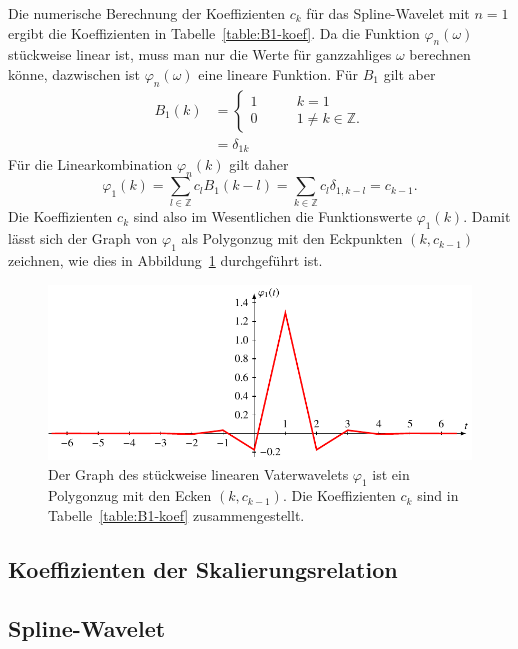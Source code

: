 \begin{beispiel}
Die numerische Berechnung der Koeffizienten $c_k$ für das Spline-Wavelet 
mit $n=1$ ergibt die Koeffizienten in Tabelle~\ref{table:B1-koef}.
Da die Funktion $\varphi_n(\omega)$ stückweise linear ist, muss man nur die
Werte für ganzzahliges $\omega$ berechnen könne, dazwischen ist
$\varphi_n(\omega)$ eine lineare Funktion.
Für $B_1$ gilt aber
\begin{align*}
B_1(k)
&=
\begin{cases}
1&\qquad k=1\\
0&\qquad 1\ne k\in\mathbb Z.
\end{cases}
\\
&=\delta_{1k}
\end{align*}
Für die Linearkombination $\varphi_n(k)$ gilt daher
\[
\varphi_1(k)
=
\sum_{l\in\mathbb Z} c_l B_1(k-l)
=
\sum_{k\in\mathbb Z} c_l \delta_{1,k-l}
=
c_{k-1}.
\]
Die Koeffizienten $c_k$ sind also im Wesentlichen die Funktionswerte
$\varphi_1(k)$.
Damit lässt sich der Graph von $\varphi_1$ als Polygonzug mit den Eckpunkten
$(k,c_{k-1})$ zeichnen, wie dies in Abbildung~\ref{phi1:polygonzug}
durchgeführt ist.
\begin{figure}
\centering
\includegraphics{chapters/9-spline/images/Bphi1.pdf}
\caption{Der Graph des stückweise linearen Vaterwavelets $\varphi_1$
ist ein Polygonzug mit den Ecken $(k,c_{k-1})$.
Die Koeffizienten $c_k$ sind in Tabelle~\ref{table:B1-koef} 
zusammengestellt.
\label{phi1:polygonzug}}
\end{figure}
\end{beispiel}

\subsection{Koeffizienten der Skalierungsrelation
\label{subsection:spline-skalierungskoeffizienten}}

\subsection{Spline-Wavelet
\label{subsection:spline-wavelet}}





